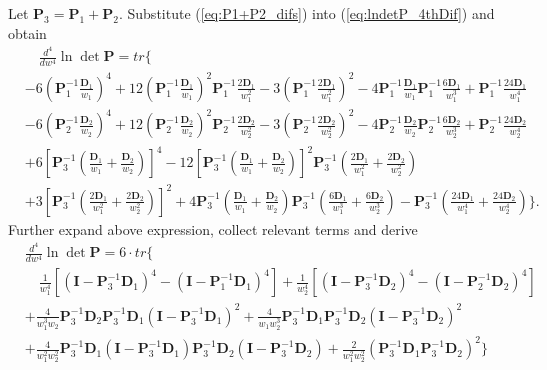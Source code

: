 \documentclass[12pt]{article}
\begin{document}
Let $\mathbf{P}_3 = \mathbf{P}_1 + \mathbf{P}_2$. Substitute (\ref{eq:P1+P2_difs}) into (\ref{eq:lndetP_4thDif}) and obtain
\begin{align*}
& \quad \frac{d^4}{dw^4} \ln \det \mathbf{P} = tr\{  \nonumber \\
& - 6 (\mathbf{P}_1^{-1} \frac{\mathbf{D}_1}{w_1})^4 + 12 (\mathbf{P}_1^{-1} \frac{\mathbf{D}_1}{w_1})^2 \mathbf{P}_1^{-1} \frac{2 \mathbf{D}_1}{w_1^2} - 3 (\mathbf{P}_1^{-1} \frac{2 \mathbf{D}_1}{w_1^2})^2 - 4 \mathbf{P}_1^{-1} \frac{\mathbf{D}_1}{w_1} \mathbf{P}_1^{-1} \frac{6 \mathbf{D}_1}{w_1^3} + \mathbf{P}_1^{-1} \frac{24 \mathbf{D}_1}{w_1^4}  \nonumber \\
& - 6 (\mathbf{P}_2^{-1} \frac{\mathbf{D}_2}{w_2})^4 + 12 (\mathbf{P}_2^{-1} \frac{\mathbf{D}_2}{w_2})^2 \mathbf{P}_2^{-1} \frac{2 \mathbf{D}_2}{w_2^2} - 3 (\mathbf{P}_2^{-1} \frac{2 \mathbf{D}_2}{w_2^2})^2 - 4 \mathbf{P}_2^{-1} \frac{\mathbf{D}_2}{w_2} \mathbf{P}_2^{-1} \frac{6 \mathbf{D}_2}{w_2^3} + \mathbf{P}_2^{-1} \frac{24 \mathbf{D}_2}{w_2^4}  \nonumber \\
& + 6 [\mathbf{P}_3^{-1} (\frac{\mathbf{D}_1}{w_1} + \frac{\mathbf{D}_2}{w_2})]^4 - 12 [\mathbf{P}_3^{-1} (\frac{\mathbf{D}_1}{w_1} + \frac{\mathbf{D}_2}{w_2})]^2 \mathbf{P}_3^{-1} (\frac{2 \mathbf{D}_1}{w_1^2} + \frac{2 \mathbf{D}_2}{w_2^2})  \nonumber \\
& + 3 [\mathbf{P}_3^{-1} (\frac{2 \mathbf{D}_1}{w_1^2} + \frac{2 \mathbf{D}_2}{w_2^2})]^2 + 4 \mathbf{P}_3^{-1} (\frac{\mathbf{D}_1}{w_1} + \frac{\mathbf{D}_2}{w_2}) \mathbf{P}_3^{-1} (\frac{6 \mathbf{D}_1}{w_1^3} + \frac{6 \mathbf{D}_2}{w_2^3}) - \mathbf{P}_3^{-1} (\frac{24 \mathbf{D}_1}{w_1^4} + \frac{24 \mathbf{D}_2}{w_2^4})\}.
\end{align*}
Further expand above expression, collect relevant terms and derive
\begin{align}   \label{eq:lndetP_4thDif_2}
&\frac{d^4}{dw^4} \ln \det \mathbf{P} = 6 \cdot tr\{  \nonumber \\
& \quad \frac{1}{w_1^4} [(\mathbf{I} - \mathbf{P}_3^{-1} \mathbf{D}_1)^4 - (\mathbf{I} - \mathbf{P}_1^{-1} \mathbf{D}_1)^4] 
  + \frac{1}{w_2^4} [(\mathbf{I} - \mathbf{P}_3^{-1} \mathbf{D}_2)^4 - (\mathbf{I} - \mathbf{P}_2^{-1} \mathbf{D}_2)^4]  \nonumber \\
& + \frac{4}{w_1^3 w_2} \mathbf{P}_3^{-1} \mathbf{D}_2 \mathbf{P}_3^{-1} \mathbf{D}_1 (\mathbf{I} - \mathbf{P}_3^{-1} \mathbf{D}_1)^2
  + \frac{4}{w_1 w_2^3} \mathbf{P}_3^{-1} \mathbf{D}_1 \mathbf{P}_3^{-1} \mathbf{D}_2 (\mathbf{I} - \mathbf{P}_3^{-1} \mathbf{D}_2)^2 \nonumber \\
& + \frac{4}{w_1^2 w_2^2} \mathbf{P}_3^{-1} \mathbf{D}_1 (\mathbf{I} - \mathbf{P}_3^{-1} \mathbf{D}_1) \mathbf{P}_3^{-1} \mathbf{D}_2 (\mathbf{I} - \mathbf{P}_3^{-1} \mathbf{D}_2)
  + \frac{2}{w_1^2 w_2^2} (\mathbf{P}_3^{-1} \mathbf{D}_1 \mathbf{P}_3^{-1} \mathbf{D}_2)^2
\}
\end{align}
\end{document}
